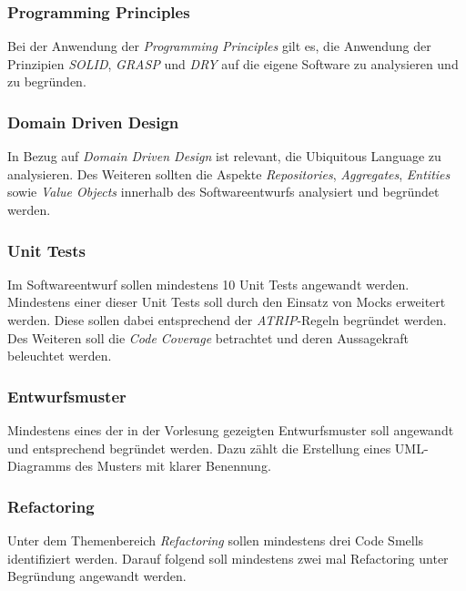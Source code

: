 \subsubsection*{Programming Principles}
Bei der Anwendung der \textit{Programming Principles} gilt es, die Anwendung der Prinzipien \textit{SOLID}, \textit{GRASP} und \textit{DRY} auf die eigene Software zu analysieren und zu begründen. 

\subsubsection*{Domain Driven Design}
In Bezug auf \textit{Domain Driven Design} ist relevant, die Ubiquitous Language zu analysieren. 
Des Weiteren sollten die Aspekte \textit{Repositories}, \textit{Aggregates}, \textit{Entities} sowie \textit{Value Objects} innerhalb des Softwareentwurfs analysiert und begründet werden.

\subsubsection*{Unit Tests}
Im Softwareentwurf sollen mindestens 10 Unit Tests angewandt werden.
Mindestens einer dieser Unit Tests soll durch den Einsatz von Mocks erweitert werden.
Diese sollen dabei entsprechend der \textit{ATRIP}-Regeln begründet werden.
Des Weiteren soll die \textit{Code Coverage} betrachtet und deren Aussagekraft beleuchtet werden.

\subsubsection*{Entwurfsmuster}
Mindestens eines der in der Vorlesung gezeigten Entwurfsmuster soll angewandt und entsprechend begründet werden.
Dazu zählt die Erstellung eines UML-Diagramms des Musters mit klarer Benennung.

\subsubsection*{Refactoring}
Unter dem Themenbereich \textit{Refactoring} sollen mindestens drei Code Smells identifiziert werden.
Darauf folgend soll mindestens zwei mal Refactoring unter Begründung angewandt werden.


